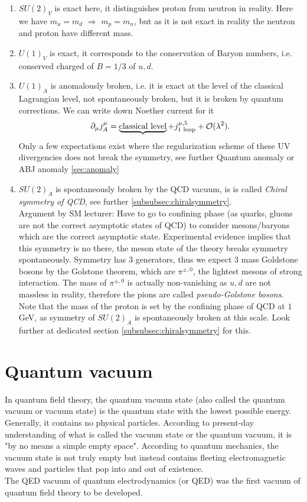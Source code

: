 \begin{enumerate}
	\item $SU(2)_V$ is exact here, it distinguishes proton from neutron in reality. Here we have $m_u=m_d$ $\Rightarrow$ $m_p=m_n$, but as it is not exact in reality the neutron and proton have different mass.
	\item $U(1)_V$ is exact, it corresponds to the conservation of Baryon numbers, i.e. conserved charged of $B=1/3$ of $u,d$.
	\item $U(1)_A$ is anomalously broken, i.e. it is exact at the level of the classical Lagrangian level, not spontaneously broken, but it is broken by quantum corrections. We can write down Noether current for it
	\begin{equation*}
	\partial_\mu j^\mu_A = \underbrace{\text{classical level}} + j^{\mu, 5}_{\text{1 loop}} + \mathcal{O}(\lambda^2).
	\end{equation*}
	Only a few expectations exist where the regularization scheme of these UV divergencies does not break the symmetry, see further Quantum anomaly or ABJ anomaly \ref{sec:anomaly}
	\item $SU(2)_A$ is spontaneously broken by the QCD vacuum, is is called \emph{Chiral symmetry of QCD}, see further \ref{subsubsec:chiralsymmetry}. \\
	Argument by SM lecturer: Have to go to confining phase (as quarks, gluons are not the correct asymptotic states of QCD) to consider mesons/baryons which are the correct asymptotic state. Experimental evidence implies that this symmetry is no there, the meson state of the theory breaks symmetry spontaneously. Symmetry has $3$ generators, thus we expect $3$ mass Goldstone bosons by the Golstone theorem, which are $\pi^{\pm,0}$, the lightest mesons of strong interaction. The mass of $\pi^{\pm,0}$ is actually non-vanishing as $u,d$ are not massless in reality, therefore the pions are called \emph{pseudo-Golstone bosons}.
	Note that the mass of the proton is set by the confining phase of QCD at $1$GeV, as symmetry of $SU(2)_A$ is spontaneously broken at this scale. Look further at dedicated section \ref{subsubsec:chiralsymmetry} for this.
 \end{enumerate}




\section{Quantum vacuum}
In quantum field theory, the quantum vacuum state (also called the quantum vacuum or vacuum state) is the quantum state with the lowest possible energy. Generally, it contains no physical particles. According to present-day understanding of what is called the vacuum state or the quantum vacuum, it is "by no means a simple empty space". According to quantum mechanics, the vacuum state is not truly empty but instead contains fleeting electromagnetic waves and particles that pop into and out of existence.\\
The QED vacuum of quantum electrodynamics (or QED) was the first vacuum of quantum field theory to be developed. \\
\\
